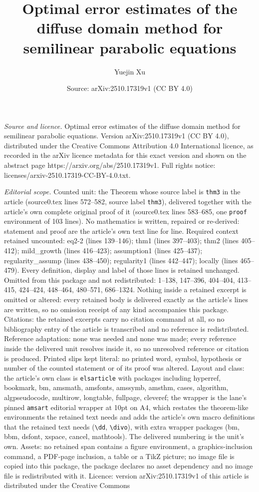 \documentclass[10pt,a4paper]{amsart}
\title[Optimal error estimates of the diffuse domain method for sem]{Optimal error estimates of the diffuse domain method for semilinear parabolic equations}
\author{Yuejin Xu}
\date{Source: arXiv:2510.17319v1 (CC BY 4.0)}
\begin{document}
\maketitle

\noindent\emph{Source and licence.} Optimal error estimates of the diffuse domain method for semilinear parabolic equations. Version arXiv:2510.17319v1 (CC BY 4.0), distributed under the Creative Commons Attribution 4.0 International licence, as recorded in the arXiv licence metadata for this exact version and shown on the abstract page https://arxiv.org/abs/2510.17319v1. Full rights notice: licenses/arxiv-2510.17319-CC-BY-4.0.txt.\par\smallskip

\noindent\textit{Editorial scope.} Counted unit: the Theorem whose source label is \texttt{thm3} in the article (source0.tex lines 572--582, source label \texttt{thm3}), delivered together with the article's own complete original proof of it (source0.tex lines 583--685, one \texttt{proof} environment of 103 lines). No mathematics is written, repaired or re-derived: statement and proof are the article's own text line for line. Required context retained uncounted: eq2-2 (lines 139--146); thm1 (lines 397--403); thm2 (lines 405--412); mild\_growth (lines 416--423); assumption1 (lines 425--437); regularity\_assump (lines 438--450); regularity1 (lines 442--447); locally (lines 465--479). Every definition, display and label of those lines is retained unchanged. Omitted from this package and not redistributed: 1--138, 147--396, 404--404, 413--415, 424--424, 448--464, 480--571, 686--1324. Nothing inside a retained excerpt is omitted or altered: every retained body is delivered exactly as the article's lines are written, so no omission receipt of any kind accompanies this package. Citations: the retained excerpts carry no citation command at all, so no bibliography entry of the article is transcribed and no reference is redistributed. Reference adaptation: none was needed and none was made; every reference inside the delivered unit resolves inside it, so no unresolved reference or citation is produced. Printed slips kept literal: no printed word, symbol, hypothesis or number of the counted statement or of its proof was altered. Layout and class: the article's own class is \texttt{elsarticle} with packages including hyperref, bookmark, bm, amsmath, amsfonts, amssymb, amsthm, cases, algorithm, algpseudocode, multirow, longtable, fullpage, cleveref; the wrapper is the lane's pinned \texttt{amsart} editorial wrapper at 10pt on A4, which restates the theorem-like environments the retained text needs and adds the article's own macro definitions that the retained text needs (\texttt{\textbackslash dd}, \texttt{\textbackslash divo}), with extra wrapper packages (bm, bbm, dsfont, xspace, cancel, mathtools). The delivered numbering is the unit's own. Assets: no retained span contains a figure environment, a graphics-inclusion command, a PDF-page inclusion, a table or a TikZ picture; no image file is copied into this package, the package declares no asset dependency and no image file is redistributed with it. Licence: version arXiv:2510.17319v1 of this article is distributed under the Creative Commons 
\end{document}
